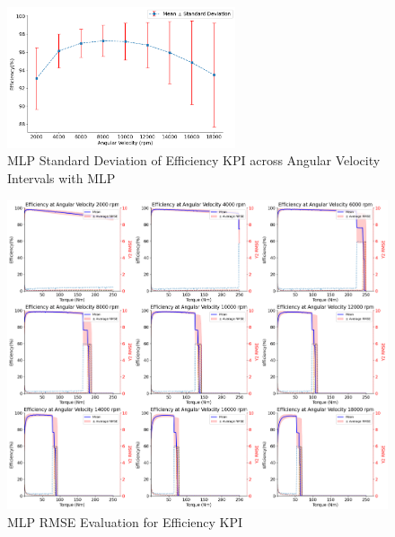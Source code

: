 \documentclass{report} %
\begin{document}
\begin{figure}[H]
    \centering
    \includegraphics[width=0.6\textwidth]{./ReportImages/stddev_y2_nn_MLP.png} 
    \caption{\ac{MLP} Standard Deviation of Efficiency \ac{KPI} across Angular Velocity Intervals with \ac{MLP}} 
    \label{fig:MLP Standard Deviation of 3D KPI(Efficiency) across Angular Velocity Intervals with MLP}
\end{figure}

\begin{figure}[H]
    \centering
    \includegraphics[width=1\textwidth]{./ReportImages/rmse_eta_MLP.png} 
    \caption{\ac{MLP} \ac{RMSE} Evaluation for Efficiency \ac{KPI}} 
    \label{fig:MLP RMSE Evaluation for Efficiency KPI}
\end{figure}
\end{document}
